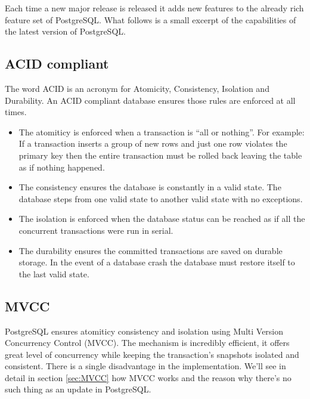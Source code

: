 Each time a new major release is released it adds new features to the already
rich feature set of PostgreSQL. What follows is a small excerpt of the
capabilities of the latest version of PostgreSQL.

\subsection{ACID compliant}

The word ACID is an acronym for Atomicity, Consistency, Isolation and
Durability. An ACID compliant database ensures those rules are enforced at all
times. \newline

\begin{itemize}

    \item The atomiticy is enforced when a transaction is ``all or nothing''. For example: If a
        transaction inserts a group of new rows and just one row violates the primary key then the entire
        transaction must be rolled back leaving the table as if nothing happened.

    \item The consistency ensures the database is constantly in a valid state. The database steps from
        one valid state to another valid state with no exceptions.

    \item The isolation is enforced when the database status can be reached as if all the concurrent
        transactions were run in serial.

    \item The durability ensures the committed transactions are saved on durable storage. In the event
        of a database crash the database must restore itself to the last valid state.

\end{itemize}

\subsection{MVCC}

PostgreSQL ensures atomiticy consistency and isolation using Multi Version
Concurrency Control (MVCC). The mechanism is incredibly efficient, it offers
great level of concurrency while keeping the transaction's snapshots isolated
and consistent. There is a single disadvantage in the implementation. We'll
see in detail in section \ref{sec:MVCC} how MVCC works and the reason why
there's no such thing as an update in PostgreSQL.

